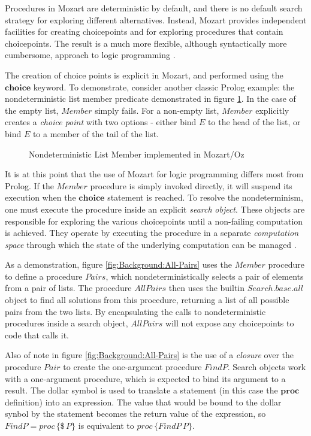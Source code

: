 Procedures in Mozart are deterministic by default, and there is no
default search strategy for exploring different alternatives. Instead,
Mozart provides independent facilities for creating choicepoints and
for exploring procedures that contain choicepoints. The result is
a much more flexible, although syntactically more cumbersome, approach
to logic programming \citep{lpinoz99}.

The creation of choice points is explicit in Mozart, and performed
using the $\mathbf{choice}$ keyword. To demonstrate, consider another
classic Prolog example: the nondeterministic list member predicate
demonstrated in figure \ref{fig:Background:Nondet-Member}. In the
case of the empty list, $Member$ simply fails. For a non-empty list,
$Member$ explicitly creates a \emph{choice point} with two options
- either bind $E$ to the head of the list, or bind $E$ to a member
of the tail of the list.

%
\begin{figure}[t]

\caption{Nondeterministic List Member implemented in Mozart/Oz\label{fig:Background:Nondet-Member}}

\end{figure}


It is at this point that the use of Mozart for logic programming differs
most from Prolog. If the $Member$ procedure is simply invoked directly,
it will suspend its execution when the $\mathbf{choice}$ statement
is reached. To resolve the nondeterminism, one must execute the procedure
inside an explicit \emph{search} \emph{object}. These objects are
responsible for exploring the various choicepoints until a non-failing
computation is achieved. They operate by executing the procedure in
a separate \emph{computation space} through which the state of the
underlying computation can be managed \citep{schulte00constraint_services}.

As a demonstration, figure \ref{fig:Background:All-Pairs} uses the
$Member$ procedure to define a procedure $Pairs$, which nondeterministically
selects a pair of elements from a pair of lists. The procedure $AllPairs$
then uses the builtin $Search.base.all$ object to find all solutions
from this procedure, returning a list of all possible pairs from the
two lists. By encapsulating the calls to nondeterministic procedures
inside a search object, $AllPairs$ will not expose any choicepoints
to code that calls it.

Also of note in figure \ref{fig:Background:All-Pairs} is the use
of a \emph{closure} over the procedure $Pair$ to create the one-argument
procedure $FindP$. Search objects work with a one-argument procedure,
which is expected to bind its argument to a result. The dollar symbol
is used to translate a statement (in this case the $\mathbf{proc}$
definition) into an expression. The value that would be bound to the
dollar synbol by the statement becomes the return value of the expression,
so $FindP=proc\,\{\$\, P\}$ is equivalent to $proc\,\{FindP\, P\}$.

